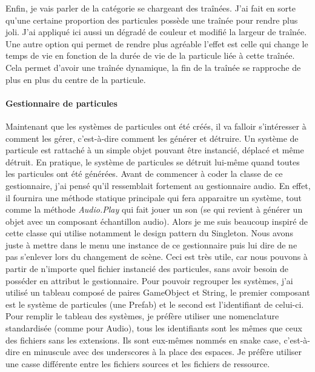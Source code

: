 \documentclass{article}
\begin{document}
Enfin, je vais parler de la catégorie se chargeant des traînées. J'ai fait en sorte qu'une certaine proportion des particules possède une traînée pour rendre plus joli. J'ai appliqué ici aussi un dégradé de couleur et modifié la largeur de traînée. Une autre option qui permet de rendre plus agréable l'effet est celle qui change le temps de vie en fonction de la durée de vie de la particule liée à cette traînée. Cela permet d'avoir une traînée dynamique, la fin de la traînée se rapproche de plus en plus du centre de la particule.


\paragraph{Gestionnaire de particules}


Maintenant que les systèmes de particules ont été créés, il va falloir s'intéresser à comment les gérer, c'est-à-dire comment les générer et détruire.
Un système de particule est rattaché à un simple objet pouvant être instancié, déplacé et même détruit. En pratique, le système de particules se détruit lui-même quand toutes les particules ont été générées.
Avant de commencer à coder la classe de ce gestionnaire, j'ai pensé qu'il ressemblait fortement au gestionnaire audio. En effet, il fournira une méthode statique principale qui fera apparaitre un système, tout comme la méthode \emph{Audio.Play} qui fait jouer un son (se qui revient à générer un objet avec un composant échantillon audio). Alors je me suis beaucoup inspiré de cette classe qui utilise notamment le design pattern du Singleton. Nous avons juste à mettre dans le menu une instance de ce gestionnaire puis lui dire de ne pas s'enlever lors du changement de scène. Ceci est très utile, car nous pouvons à partir de n'importe quel fichier instancié des particules, sans avoir besoin de posséder en attribut le gestionnaire.
Pour pouvoir regrouper les systèmes, j'ai utilisé un tableau composé de paires GameObject et String, le premier composant est le système de particules (une Prefab) et le second est l'identifiant de celui-ci. Pour remplir le tableau des systèmes, je préfère utiliser une nomenclature standardisée (comme pour Audio), tous les identifiants sont les mêmes que ceux des fichiers sans les extensions. Ils sont eux-mêmes nommés en snake case, c'est-à-dire en minuscule avec des underscores à la place des espaces. Je préfère utiliser une casse différente entre les fichiers sources et les fichiers de ressource.
\end{document}
